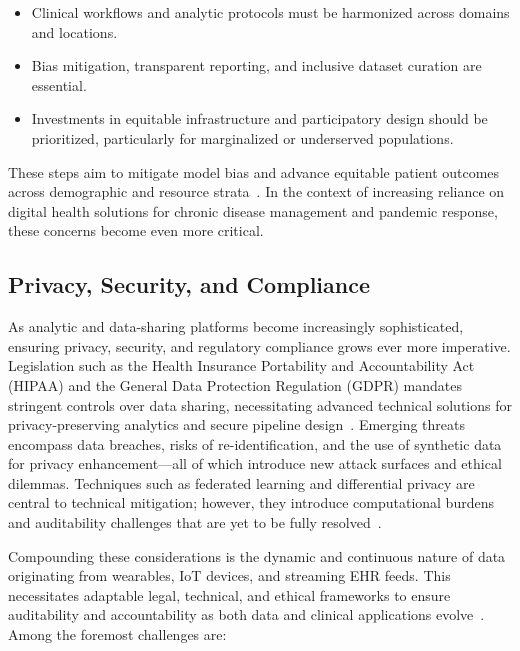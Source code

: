 \begin{itemize}
    \item Clinical workflows and analytic protocols must be harmonized across domains and locations.
    \item Bias mitigation, transparent reporting, and inclusive dataset curation are essential.
    \item Investments in equitable infrastructure and participatory design should be prioritized, particularly for marginalized or underserved populations.
\end{itemize}

These steps aim to mitigate model bias and advance equitable patient outcomes across demographic and resource strata~\cite{ref44,ref45,ref50,ref55,ref60,ref61,ref64,ref65,ref66,ref67,ref74,ref75,ref78,ref79,ref80,ref84,ref90,ref106}. In the context of increasing reliance on digital health solutions for chronic disease management and pandemic response, these concerns become even more critical.

\subsection{Privacy, Security, and Compliance}

As analytic and data-sharing platforms become increasingly sophisticated, ensuring privacy, security, and regulatory compliance grows ever more imperative. Legislation such as the Health Insurance Portability and Accountability Act (HIPAA) and the General Data Protection Regulation (GDPR) mandates stringent controls over data sharing, necessitating advanced technical solutions for privacy-preserving analytics and secure pipeline design~\cite{ref2, ref4, ref5, ref6, ref7, ref8, ref9, ref10, ref24, ref25, ref28, ref30, ref31, ref33, ref34, ref35, ref36, ref41, ref43, ref46, ref50, ref54, ref51, ref61, ref62, ref63, ref64, ref65, ref70, ref71, ref72, ref75, ref76, ref77, ref78, ref79, ref82, ref83, ref84, ref90, ref91, ref106}. Emerging threats encompass data breaches, risks of re-identification, and the use of synthetic data for privacy enhancement—all of which introduce new attack surfaces and ethical dilemmas. Techniques such as federated learning and differential privacy are central to technical mitigation; however, they introduce computational burdens and auditability challenges that are yet to be fully resolved~\cite{ref5, ref6, ref7, ref54, ref65, ref71, ref72, ref75, ref77, ref78, ref79, ref84, ref90, ref91, ref106}.

Compounding these considerations is the dynamic and continuous nature of data originating from wearables, IoT devices, and streaming EHR feeds. This necessitates adaptable legal, technical, and ethical frameworks to ensure auditability and accountability as both data and clinical applications evolve~\cite{ref51, ref56, ref61, ref63, ref65, ref70, ref72, ref75, ref76, ref78, ref82, ref84, ref90, ref91, ref106}. Among the foremost challenges are:

